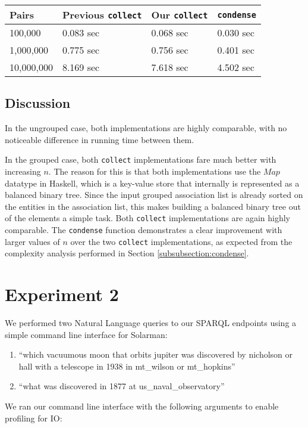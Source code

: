 \documentclass[../main.tex]{subfiles}
\begin{document}
\begin{tabular}{|l|l|l|l|}
	\hline
	Pairs & Previous \texttt{collect} & Our \texttt{collect} & \texttt{condense} \\
	\hline
	100,000 & 0.083 sec & 0.068 sec & 0.030 sec \\
	\hline
	1,000,000 & 0.775 sec & 0.756 sec & 0.401 sec \\
	\hline
	10,000,000 & 8.169 sec & 7.618 sec & 4.502 sec \\
	\hline
\end{tabular}

\subsection{Discussion}

In the ungrouped case, both implementations are highly comparable, with no noticeable difference in running time between them.

In the grouped case, both \texttt{collect} implementations fare much better with increasing $n$.  The reason for this is that both implementations use the $Map$ datatype in Haskell, which is a key-value store that internally is represented as a balanced binary tree.  Since the input grouped association list is already sorted on the entities in the association list, this makes building a balanced binary tree out of the elements a simple task.  Both \texttt{collect} implementations are again highly comparable.  The \texttt{condense} function demonstrates a clear improvement with larger values of $n$ over the two \texttt{collect} implementations, as expected from the complexity analysis performed in Section \ref{subsubsection:condense}.

\section{Experiment 2}

We performed two Natural Language queries to our SPARQL endpoints using a simple command line interface for Solarman:

\begin{enumerate}
	\item ``which vacuumous moon that orbits jupiter was discovered by nicholson or hall with a telescope in 1938 in mt\_wilson or mt\_hopkins''
	\item ``what was discovered in 1877 at us\_naval\_observatory''
\end{enumerate}

We ran our command line interface with the following arguments to enable profiling for IO:
\end{document}
